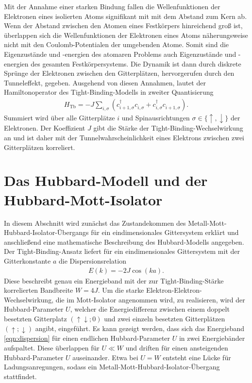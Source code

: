 Mit der Annahme einer starken Bindung fallen die Wellenfunktionen der Elektronen eines isolierten Atoms signifikant mit mit dem Abstand zum Kern ab.
Wenn der Abstand zwischen den Atomen eines Festkörpers hinreichend groß ist, überlappen sich die Wellenfunktionen der Elektronen eines Atoms näherungsweise nicht mit
den Coulomb-Potentialen der umgebenden Atome. Somit sind die Eigenzustände und -energien des atomaren Problems auch Eigenzustände und -energien des gesamten Festkörpersystems.
Die Dynamik ist dann durch diskrete Sprünge der Elektronen zwischen den Gitterplätzen, hervorgerufen durch den Tunneleffekt, gegeben.
Ausgehend von diesen Annahmen, lautet der Hamiltonoperator des Tight-Binding-Modells in zweiter Quantisierung
\begin{align}
  H_\text{Tb} = -J \sum_{i,\sigma} (c_{i+1,\sigma}^{\dag}c_{i,\sigma}^{\phantom{\dag}} + c_{i,\sigma}^{\dag}c_{i+1,\sigma}^{\phantom{\dag}}).
  \label{eqn:hamiltontb}
\end{align}
Summiert wird über alle Gitterplätze $i$ und Spinausrichtungen $\sigma \in \{ \uparrow,\downarrow \}$ der Elektronen.
Der Koeffizient $J$ gibt die Stärke der Tight-Binding-Wechselwirkung an und ist daher mit der Tunnelwahrscheinlichkeit eines Elektrons zwischen zwei Gitterplätzen korreliert. \cite{czycholl}

\section{Das Hubbard-Modell und der Hubbard-Mott-Isolator}
\label{sec:hubbardmodell}

In diesem Abschnitt wird zunächst das Zustandekommen des Metall-Mott-Hubbard-Isolator-Übergangs für ein eindimensionales Gittersystem erklärt und anschließend
eine mathematische Beschreibung des Hubbard-Modells angegeben.
Der Tight-Binding-Ansatz liefert für ein eindimensionales Gittersystem mit der Gitterkonstante $a$ die Dispersionsrelation
\begin{align}
  E(k) = -2J \cos \left(ka \right).
  \label{eqn:dispersion}
\end{align}
Diese beschreibt genau ein Energieband mit der zur Tight-Binding-Stärke korrelierten Bandbreite $W = 4J$.
Um die starke Elektron-Elektron-Wechselwirkung, die im Mott-Isolator angenommen wird, zu realisieren, wird der Hubbard-Parameter $U$, welcher die Energiedifferenz
zwischen einem doppelt besetzten Gitterplatz $(\uparrow \downarrow;0)$ und zwei einzeln besetzten Gitterplätzen $(\uparrow; \downarrow)$ angibt, eingeführt.
Es kann gezeigt werden, dass sich das Energieband \eqref{eqn:dispersion} für einen endlichen Hubbard-Parameter $U$ in zwei Energiebänder aufspaltet. Diese überlappen
für $U \ll W$ und driften für einen ansteigenden Hubbard-Parameter $U$ auseinander.
Etwa bei $U=W$ entsteht eine Lücke für Ladungsanregungen, sodass ein Metall-Mott-Hubbard-Isolator-Übergang stattfindet.

